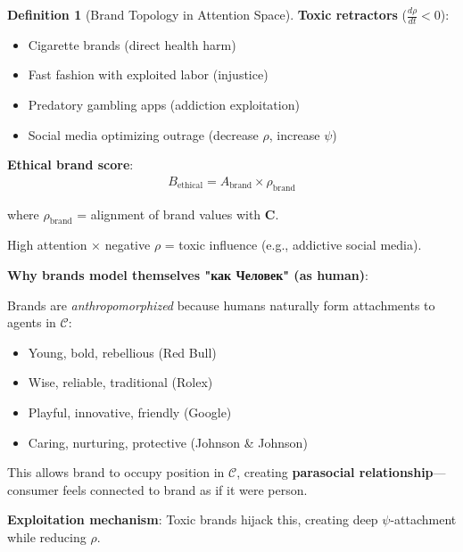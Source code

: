 \documentclass[11pt,a4paper]{article}
\theoremstyle{definition}
\newtheorem{definition}{Definition}[section]
\theoremstyle{remark}
\newcommand{\CC}{\mathcal{C}}
\begin{document}
\begin{small}
\begin{enumerate}
\begin{definition}[Brand Topology in Attention Space]
\textbf{Toxic retractors} (\(\frac{d\rho}{dt} < 0\)):
\begin{itemize}
    \item Cigarette brands (direct health harm)
    \item Fast fashion with exploited labor (injustice)
    \item Predatory gambling apps (addiction exploitation)
    \item Social media optimizing outrage (decrease \(\rho\), increase \(\psi\))
\end{itemize}

\textbf{Ethical brand score}:
\begin{align}
B_{\text{ethical}} = A_{\text{brand}} \times \rho_{\text{brand}}
\end{align}

where \(\rho_{\text{brand}}\) = alignment of brand values with \(\mathbf{C}\).

High attention × negative \(\rho\) = toxic influence (e.g., addictive social media).

\textbf{Why brands model themselves "как Человек" (as human)}:

Brands are \textit{anthropomorphized} because humans naturally form attachments to agents in \(\CC\):
\begin{itemize}
    \item Young, bold, rebellious (Red Bull)
    \item Wise, reliable, traditional (Rolex)
    \item Playful, innovative, friendly (Google)
    \item Caring, nurturing, protective (Johnson \& Johnson)
\end{itemize}

This allows brand to occupy position in \(\CC\), creating \textbf{parasocial relationship}—consumer feels connected to brand as if it were person.

\textbf{Exploitation mechanism}: Toxic brands hijack this, creating deep \(\psi\)-attachment while reducing \(\rho\).
\end{definition}

\begin{figure}[H]
\centering
{}
\end{figure}
\end{enumerate}
\end{small}
\end{document}
